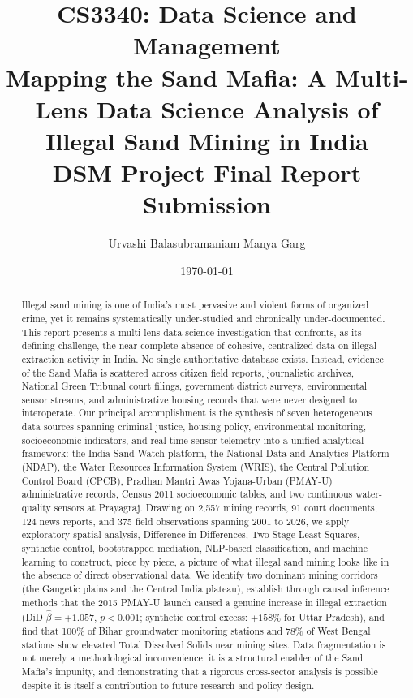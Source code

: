 \documentclass[12pt]{article}
\title{
    \vspace{-1cm}
    {\large CS3340: Data Science and Management} \\[0.5em]
    {\LARGE \textbf{Mapping the Sand Mafia: A Multi-Lens Data Science Analysis of Illegal Sand Mining in India}} \\[0.5em]
    {\normalsize DSM Project Final Report Submission}
}
\author{Urvashi Balasubramaniam \quad Manya Garg}
\date{\today}
\begin{document}
\maketitle
\thispagestyle{fancy}

\begin{abstract}
Illegal sand mining is one of India's most pervasive and violent forms of organized crime, yet it remains systematically under-studied and chronically under-documented. This report presents a multi-lens data science investigation that confronts, as its defining challenge, the near-complete absence of cohesive, centralized data on illegal extraction activity in India. No single authoritative database exists. Instead, evidence of the Sand Mafia is scattered across citizen field reports, journalistic archives, National Green Tribunal court filings, government district surveys, environmental sensor streams, and administrative housing records that were never designed to interoperate. Our principal accomplishment is the synthesis of seven heterogeneous data sources spanning criminal justice, housing policy, environmental monitoring, socioeconomic indicators, and real-time sensor telemetry into a unified analytical framework: the India Sand Watch platform, the National Data and Analytics Platform (NDAP), the Water Resources Information System (WRIS), the Central Pollution Control Board (CPCB), Pradhan Mantri Awas Yojana-Urban (PMAY-U) administrative records, Census 2011 socioeconomic tables, and two continuous water-quality sensors at Prayagraj. Drawing on 2,557 mining records, 91 court documents, 124 news reports, and 375 field observations spanning 2001 to 2026, we apply exploratory spatial analysis, Difference-in-Differences, Two-Stage Least Squares, synthetic control, bootstrapped mediation, NLP-based classification, and machine learning to construct, piece by piece, a picture of what illegal sand mining looks like in the absence of direct observational data. We identify two dominant mining corridors (the Gangetic plains and the Central India plateau), establish through causal inference methods that the 2015 PMAY-U launch caused a genuine increase in illegal extraction (DiD $\hat{\beta} = +1.057$, $p < 0.001$; synthetic control excess: $+158\%$ for Uttar Pradesh), and find that 100\% of Bihar groundwater monitoring stations and 78\% of West Bengal stations show elevated Total Dissolved Solids near mining sites. Data fragmentation is not merely a methodological inconvenience: it is a structural enabler of the Sand Mafia's impunity, and demonstrating that a rigorous cross-sector analysis is possible despite it is itself a contribution to future research and policy design.
\end{abstract}
\end{document}
